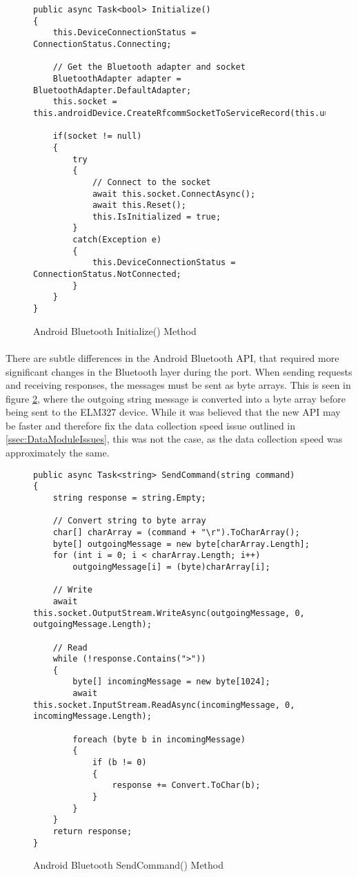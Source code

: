 		\begin{figure}[h]
			\begin{lstlisting}
public async Task<bool> Initialize()
{
	this.DeviceConnectionStatus = ConnectionStatus.Connecting;
	
	// Get the Bluetooth adapter and socket
    BluetoothAdapter adapter = BluetoothAdapter.DefaultAdapter;
	this.socket = this.androidDevice.CreateRfcommSocketToServiceRecord(this.uuid);
    
    if(socket != null)
	{
		try
		{
			// Connect to the socket
			await this.socket.ConnectAsync();                           
			await this.Reset();
			this.IsInitialized = true;
		}
		catch(Exception e)
		{
			this.DeviceConnectionStatus = ConnectionStatus.NotConnected;
		}                        
	}
}
			\end{lstlisting}
			\caption{Android Bluetooth Initialize() Method}
			\label{code:AndroidBluetoothInit}
		\end{figure}		

		\paragraph{}{
		There are subtle differences in the Android Bluetooth API, that required more significant changes in the Bluetooth layer during the port. When sending requests and receiving responses, the messages must be sent as byte arrays. This is seen in figure \ref{code:AndroidBluetoothSend}, where the outgoing string message is converted into a byte array before being sent to the ELM327 device. While it was believed that the new API may be faster and therefore fix the data collection speed issue outlined in \ref{ssec:DataModuleIssues}, this was not the case, as the data collection speed was approximately the same.
		}

		\begin{figure}[h]
			\begin{lstlisting}
public async Task<string> SendCommand(string command)
{
    string response = string.Empty;

	// Convert string to byte array
	char[] charArray = (command + "\r").ToCharArray();
	byte[] outgoingMessage = new byte[charArray.Length];
	for (int i = 0; i < charArray.Length; i++)
		outgoingMessage[i] = (byte)charArray[i];

	// Write
	await this.socket.OutputStream.WriteAsync(outgoingMessage, 0, outgoingMessage.Length);

	// Read
	while (!response.Contains(">"))
	{
		byte[] incomingMessage = new byte[1024];
		await this.socket.InputStream.ReadAsync(incomingMessage, 0, incomingMessage.Length);

		foreach (byte b in incomingMessage)
		{
			if (b != 0)
			{
				response += Convert.ToChar(b);
			}
		}    
	}
	return response;
}
			\end{lstlisting}
			\caption{Android Bluetooth SendCommand() Method}
			\label{code:AndroidBluetoothSend}
		\end{figure}
		
